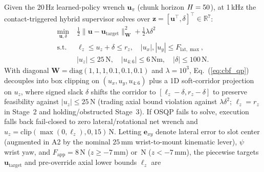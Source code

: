 \documentclass[letterpaper,10pt,conference]{IEEEtran}
\begin{document}
Given the 20\,Hz learned-policy wrench $\mathbf{u}_\pi$ (chunk horizon $H=50$), at 1\,kHz the contact-triggered hybrid supervisor solves over $\mathbf{z}=[\mathbf{u}^\top,\delta]^\top\in\mathbb{R}^7$:
\begin{equation}
\begin{aligned}
\min_{\mathbf{u},\delta}\;&\tfrac12\|\mathbf{u}-\mathbf{u}_{\mathrm{target}}\|_{\mathbf{W}}^2+\tfrac12\lambda\delta^2\\
\mathrm{s.t.}\;&\ell_z \le u_z+\delta\le r_z,\quad
 |u_x|,|u_y|\le F_{\mathrm{lat},\max},\\
& |u_z|\le 25\,\mathrm{N},\quad
|u_{4:6}|\le 6\,\mathrm{Nm},\quad |\delta|\le100\,\mathrm{N}.
\end{aligned}
\label{eq:cbf_qp}
\end{equation}
With diagonal $\mathbf{W}=\mathrm{diag}(1,1,1,0.1,0.1,0.1)$ and $\lambda=10^3$, Eq.~(\ref{eq:cbf_qp}) decouples into box clipping on $(u_x,u_y,u_{4:6})$ plus a 1D soft-corridor projection on $u_z$, where signed slack $\delta$ shifts the corridor to $[\ell_z-\delta,r_z-\delta]$ to preserve feasibility against $|u_z|\le 25$\,N (trading axial bound violation against $\lambda\delta^2$; $\ell_z=r_z$ in Stage~2 and holding/obstructed Stage~3). If OSQP fails to solve, execution falls back fail-closed to zero lateral/rotational net wrench and $u_z=\mathrm{clip}(\max(0,\ell_z),0,15)\,\mathrm{N}$. Letting $\mathbf{e}_{xy}$ denote lateral error to slot center (augmented in A2 by the nominal $25$\,mm wrist-to-mount kinematic lever), $\psi$ wrist yaw, and $F_{\mathrm{app}}=8$\,N ($z\ge -7$\,mm) or \DeepPush\,N ($z<-7$\,mm), the piecewise targets $\mathbf{u}_{\mathrm{target}}$ and pre-override axial lower bounds $\ell_z$ are
\end{document}
